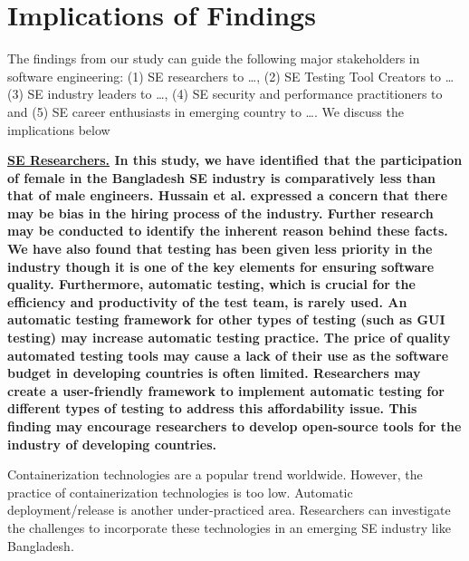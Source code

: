 \section{Implications of Findings}\label{implications}
The findings from our study can guide the following major stakeholders in software engineering: (1) SE researchers to \ldots, 
(2) SE Testing Tool Creators to \ldots (3) SE industry leaders to \ldots, (4) SE security and performance practitioners to and (5) SE career enthusiasts in emerging country to \ldots. We discuss the implications below

\bf{\ul{SE Researchers.}} In this study, we have identified that the participation of female in the Bangladesh SE industry is comparatively less than that of male engineers.  Hussain et al.\citep{Hussain2020} expressed a concern that there may be bias in the hiring process of the industry. Further research may be conducted to identify the inherent reason behind these facts. We have also found that testing has been given less priority in the industry though it is one of the key elements for ensuring software quality. Furthermore, automatic testing, which is crucial for the efficiency and productivity of the test team, is rarely used. An automatic testing framework for other types of testing (such as GUI testing) may increase automatic testing practice. The price of quality automated testing tools may cause a lack of their use as the software budget in developing countries is often limited. Researchers may create a user-friendly framework to implement automatic testing for different types of testing to address this affordability issue. This finding may encourage researchers to develop open-source tools for the industry of developing countries. 

Containerization technologies are a popular trend worldwide. However, the practice of containerization technologies is too low. Automatic deployment/release is another under-practiced area. Researchers can investigate the challenges to incorporate these technologies in an emerging SE industry like Bangladesh.

